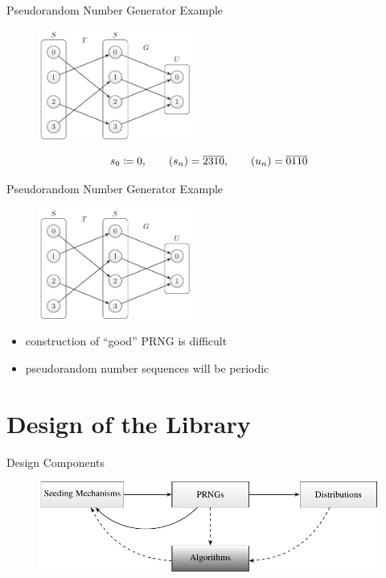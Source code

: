 \documentclass[aspectratio=169]{beamer}
\begin{document}
    \begin{frame}{Pseudorandom Number Generator Example}
      \begin{figure}
        \includegraphics[width=0.45\textwidth]{figures/prng_example.pdf}
      \end{figure}
      \begin{mybox}
        \[
          s_0 \coloneqq 0, \qquad
          (s_n) = \overline{2310}, \qquad
          (u_n) = \overline{0110}
        \]
      \end{mybox}
    \end{frame}

    \begin{frame}{Pseudorandom Number Generator Example}
      \begin{figure}
        \includegraphics[width=0.45\textwidth]{figures/prng_example.pdf}
      \end{figure}
      \begin{itemize}
        \item construction of \enquote{good} PRNG is difficult
        \pause
        \item pseudorandom number sequences will be periodic
      \end{itemize}
    \end{frame}

  \section{Design of the Library} %
  \label{sec:design}
    \begin{frame}{Design Components}
      \begin{figure}
        \includegraphics[width=\textwidth]{figures/api_parts.pdf}
      \end{figure}
    \end{frame}
\end{document}
